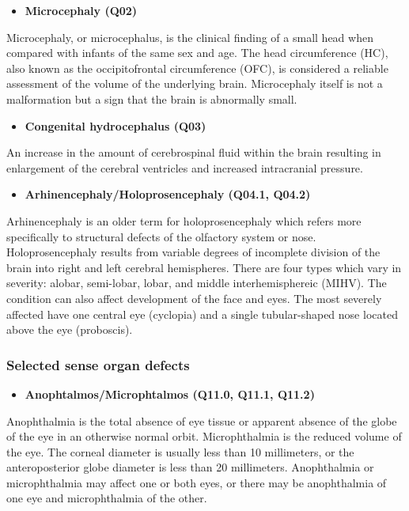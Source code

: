 \documentclass[
]{krantz}
\providecommand{\tightlist}{%
  \setlength{\itemsep}{0pt}\setlength{\parskip}{0pt}}
\begin{document}
\begin{itemize}
\tightlist
\item
  \textbf{Microcephaly (Q02)}
\end{itemize}

Microcephaly, or microcephalus, is the clinical finding of a small head when compared with infants of the same sex and age. The head circumference (HC), also known as the occipitofrontal circumference (OFC), is considered a reliable assessment of the volume of the underlying brain. Microcephaly itself is not a malformation but a sign that the brain is abnormally small.

\begin{itemize}
\tightlist
\item
  \textbf{Congenital hydrocephalus (Q03)}
\end{itemize}

An increase in the amount of cerebrospinal fluid within the brain resulting in enlargement of the cerebral ventricles and increased intracranial pressure.

\begin{itemize}
\tightlist
\item
  \textbf{Arhinencephaly/Holoprosencephaly (Q04.1, Q04.2)}
\end{itemize}

Arhinencephaly is an older term for holoprosencephaly which refers more specifically to structural defects of the olfactory system or nose. Holoprosencephaly results from variable degrees of incomplete division of the brain into right and left cerebral hemispheres. There are four types which vary in severity: alobar, semi-lobar, lobar, and middle interhemisphereic (MIHV). The condition can also affect development of the face and eyes. The most severely affected have one central eye (cyclopia) and a single tubular-shaped nose located above the eye (proboscis).

\hypertarget{section2113}{%
\subsubsection{Selected sense organ defects}\label{section2113}}

\begin{itemize}
\tightlist
\item
  \textbf{Anophtalmos/Microphtalmos (Q11.0, Q11.1, Q11.2)}
\end{itemize}

Anophthalmia is the total absence of eye tissue or apparent absence of the globe of the eye in an otherwise normal orbit. Microphthalmia is the reduced volume of the eye. The corneal diameter is usually less than 10 millimeters, or the anteroposterior globe diameter is less than 20 millimeters. Anophthalmia or microphthalmia may affect one or both eyes, or there may be anophthalmia of one eye and microphthalmia of the other.
\end{document}

